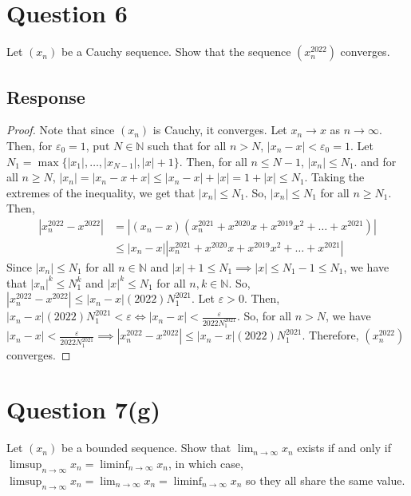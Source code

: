 \documentclass[13pt]{article}
\begin{document}
\newpage
\section*{Question 6}
Let $(x_n)$ be a Cauchy sequence. Show that the sequence
$(x_n^{2022})$ converges.

\subsection*{Response}
\begin{proof}
  Note that since $(x_n)$ is Cauchy, it converges.
  Let $x_n \rightarrow x$ as $n \rightarrow \infty$. Then, for
  $\varepsilon_0 = 1$, put $N \in \mathbb{N}$ such that for all $n >
  N$, $|x_n - x| < \varepsilon_0 = 1$. Let $N_1 = \max{\{|x_1|, \ldots,
    |x_{N - 1}|, |x| + 1\}}$. Then, for all $n \leq N - 1$, $|x_n|
  \leq N_1$. and for all $n \geq N$, $|x_n| = |x_n - x + x| \leq |x_n
  - x| + |x| = 1 + |x| \leq N_1$. Taking the extremes of the
  inequality, we get that $|x_n| \leq N_1$. So, $|x_n| \leq N_1$ for
  all $n \geq N_1$. Then,
  \begin{align*}
    |x_n^{2022} - x^{2022}| &= |(x_n - x)(x_n^{2021} + x^{2020}x +
    x^{2019}x^2 + \ldots + x^{2021})| \\
                            &\leq |x_n - x||x_n^{2021} + x^{2020}x +
                              x^{2019}x^2 + \ldots + x^{2021}|
  \end{align*}
  Since $|x_n| \leq N_1$ for all $n \in \mathbb{N}$ and $|x| + 1 \leq
  N_1 \implies |x| \leq N_1 - 1 \leq N_1$, we have that $|x_n|^k \leq
  N_1^k$ and $|x|^k \leq N_1$ for all $n, k \in
  \mathbb{N}$. So, $|x_n^{2022} - x^{2022}| \leq |x_n -
  x|(2022)N_1^{2021}$. Let $\varepsilon > 0$. Then, $|x_n - x|(2022)N_1^{2021} <
  \varepsilon \iff |x_n - x| <
  \frac{\varepsilon}{2022N_1^{2021}}$. So, for all $n > N$, we have
  $|x_n - x| < \frac{\varepsilon}{2022N_1^{2021}} \implies |x_n^{2022}
    - x^{2022}| \leq |x_n - x|(2022)N_1^{2021}$. Therefore,
    $(x_n^{2022})$ converges.
\end{proof}





\newpage
\section*{Question 7(g)}
Let $(x_n)$ be a bounded sequence. Show that $\lim_{n \rightarrow
  \infty} x_n$ exists if and only if $\limsup_{n \rightarrow \infty}
x_n = \liminf_{n \rightarrow \infty} x_n$, in which case, $\limsup_{n
  \rightarrow \infty} x_n = \lim_{n \rightarrow \infty} x_n =
\liminf_{n \rightarrow \infty} x_n$ so they all share the same value.
\end{document}
